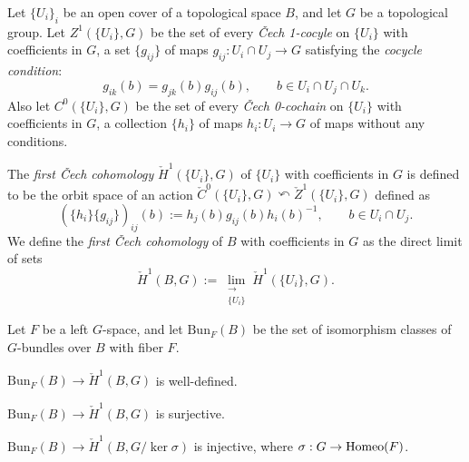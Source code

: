 \documentclass{../../large}
\begin{document}
\begin{prb}
Let $\{U_i\}_i$ be an open cover of a topological space $B$, and let $G$ be a topological group.
Let $Z^1(\{U_i\},G)$ be the set of every \emph{\v Cech 1-cocyle} on $\{U_i\}$ with coefficients in $G$, a set $\{g_{ij}\}$ of maps $g_{ij}:U_i\cap U_j\to G$ satisfying the \emph{cocycle condition}:
\[g_{ik}(b)=g_{jk}(b)g_{ij}(b),\qquad b\in U_i\cap U_j\cap U_k.\]
Also let $C^0(\{U_i\},G)$ be the set of every \emph{\v Cech 0-cochain} on $\{U_i\}$ with coefficients in $G$, a collection $\{h_i\}$ of maps $h_i:U_i\to G$ of maps without any conditions.

The \emph{first \v Cech cohomology} $\check H^1(\{U_i\},G)$ of $\{U_i\}$ with coefficients in $G$ is defined to be the orbit space of an action $\check C^0(\{U_i\},G)\curvearrowleft\check Z^1(\{U_i\},G)$ defined as
\[(\{h_i\}\{g_{ij}\})_{ij}(b):=h_j(b)g_{ij}(b)h_i(b)^{-1},
\qquad b\in U_i\cap U_j.\]
We define the \emph{first \v Cech cohomology} of $B$ with coefficients in $G$ as the direct limit of sets
\[\check H^1(B,G):=\lim_{\substack{\longrightarrow\\\{U_i\}}}\check H^1(\{U_i\},G).\]

Let $F$ be a left $G$-space, and let $\mathrm{Bun}_F(B)$ be the set of isomorphism classes of $G$-bundles over $B$ with fiber $F$.
\begin{parts}
\item $\mathrm{Bun}_F(B)\to\check H^1(B,G)$ is well-defined.
\item $\mathrm{Bun}_F(B)\to\check H^1(B,G)$ is surjective.
\item $\mathrm{Bun}_F(B)\to\check H^1(B,G/\ker\sigma)$ is injective, where $\sigma:G\to\operatorname{Homeo}(F)$.
\end{parts}
\end{prb}
\end{document}
